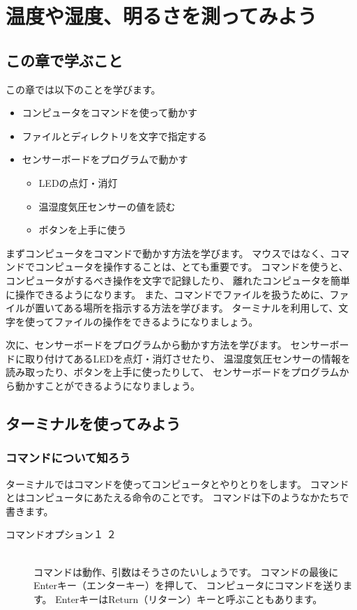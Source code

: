 \chapter{温度や湿度、明るさを測ってみよう}
\section{この章で学ぶこと}
この章では以下のことを学びます。

\begin{itemize}
  \item コンピュータをコマンドを使って動かす
  \item ファイルとディレクトリを文字で指定する
  \item センサーボードをプログラムで動かす
  \begin{itemize}
    \item LEDの点灯・消灯
    \item 温湿度気圧センサーの値を読む
    \item ボタンを上手に使う
  \end{itemize}
\end{itemize}

まずコンピュータをコマンドで動かす方法を学びます。
マウスではなく、コマンドでコンピュータを操作することは、とても重要です。
コマンドを使うと、コンピュータがするべき操作を文字で記録したり、
離れたコンピュータを簡単に操作できるようになります。
また、コマンドでファイルを扱うために、ファイルが置いてある場所を指示する方法を学びます。
ターミナルを利用して、文字を使ってファイルの操作をできるようになりましょう。

次に、センサーボードをプログラムから動かす方法を学びます。
センサーボードに取り付けてあるLEDを点灯・消灯させたり、
温湿度気圧センサーの情報を読み取ったり、ボタンを上手に使ったりして、
センサーボードをプログラムから動かすことができるようになりましょう。

\section{ターミナルを使ってみよう}
\subsection{コマンドについて知ろう}

ターミナルではコマンドを使ってコンピュータとやりとりをします。
コマンドとはコンピュータにあたえる命令のことです。
コマンドは下のようなかたちで書きます。

\begin{description}
\item[コマンド\textvisiblespace オプション\textvisiblespace {}１\textvisiblespace 
{}２]\mbox{}\\
 コマンドは動作、引数はそうさのたいしょうです。
 コマンドの最後にEnterキー（エンターキー）を押して、
 コンピュータにコマンドを送ります。
 EnterキーはReturn（リターン）キーと呼ぶこともあります。
\end{description}

